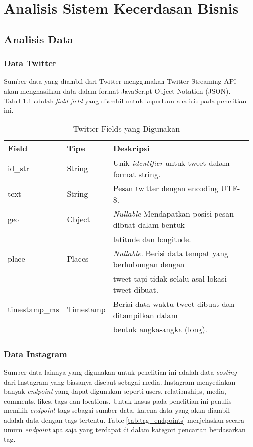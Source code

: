 \chapter{Analisis Sistem Kecerdasan Bisnis}

\section{Analisis Data}
\subsection{Data Twitter}
Sumber data yang diambil dari Twitter menggunakan Twitter Streaming API akan menghasilkan data dalam format JavaScript Object Notation (JSON). Tabel \ref{tab:twitter_fields} adalah \textit{field-field} yang diambil untuk keperluan analisis pada penelitian ini. 

\begin{table}[!htb]
	\centering
	\begin{tabular}{| l | l | l |}
		\hline
		Field & Tipe & Deskripsi \\
	 	\hline
	 	id\_str & String & Unik \textit{identifier} untuk tweet dalam format string. \\
	 	text & String & Pesan twitter dengan encoding UTF-8. \\
	 	geo & Object & \textit{Nullable} Mendapatkan posisi pesan dibuat dalam bentuk\\
	 	& & latitude dan longitude. \\
	 	place & Places & \textit{Nullable}. Berisi data tempat yang berhubungan dengan\\
	 	& & tweet tapi tidak selalu asal lokasi tweet dibuat. \\
	 	timestamp\_ms & Timestamp & Berisi data waktu tweet dibuat dan ditampilkan dalam\\
	 	& & bentuk angka-angka (long).\\
	 	\hline
	\end{tabular}	
	\caption{Twitter Fields yang Digunakan}\label{tab:twitter_fields}
\end{table}	

\subsection{Data Instagram}
Sumber data lainnya yang digunakan untuk penelitian ini adalah data \textit{posting} dari Instagram yang biasanya disebut sebagai media. Instagram menyediakan banyak \textit{endpoint} yang dapat digunakan seperti users, relationships, media, comments, likes, tags dan locations. Untuk kasus pada penelitian ini penulis memilih \textit{endpoint} tags sebagai sumber data, karena data yang akan diambil adalah data dengan tags tertentu. Table \ref{tab:tag_endpoints} menjelaskan secara umum \textit{endpoint} apa saja yang terdapat di dalam kategori pencarian berdasarkan tag.

